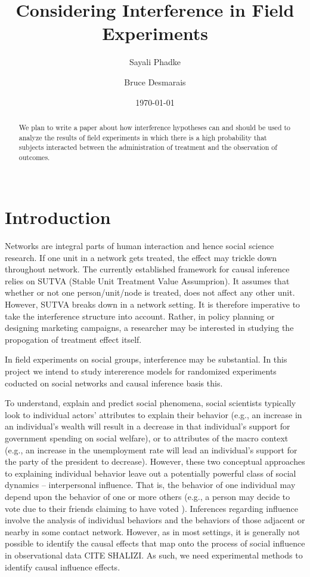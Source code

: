 \documentclass[12pt]{article}
\title{\vspace{-2cm} Considering Interference in Field Experiments }
\author{ Sayali Phadke \and Bruce Desmarais} \date{\today}
\begin{document}
\maketitle




\begin{abstract}

 \noindent  We plan to write a paper about how interference hypotheses can and should be used to analyze the results of field experiments in which there is a high probability that subjects interacted between the administration of treatment and the observation of outcomes. \\~\\

\end{abstract}
\thispagestyle{empty}
\doublespacing
\section{Introduction}

Networks are integral parts of human interaction and hence social science research. If one unit in a network gets treated, the effect may trickle down throughout network. The currently established framework for causal inference relies on SUTVA (Stable Unit Treatment Value Assumprion). It assumes that whether or not one person/unit/node is treated, does not affect any other unit. However, SUTVA breaks down in a network setting. It is therefore imperative to take the interference structure into account. Rather, in policy planning or designing marketing campaigns, a researcher may be interested in studying the propogation of treatment effect itself.

In field experiments on social groups, interference may be substantial. In this project we intend to study intererence models for randomized experiments coducted on social networks and causal inference basis this.

To understand, explain and predict social phenomena, social scientists typically look to individual actors' attributes to explain their behavior (e.g., an increase in an individual's wealth will result in a decrease in that individual's support for government spending on social welfare), or to attributes of the macro context (e.g., an increase in the unemployment rate will lead an individual's support for the party of the president to decrease). However, these two conceptual approaches to explaining individual behavior leave out a potentially powerful class of social dynamics -- interpersonal influence. That is, the behavior of one individual may depend upon the behavior of one or more others (e.g., a person may decide to vote due to their friends claiming to have voted \citep{Bond:2012}). Inferences regarding influence involve the analysis of individual behaviors and the behaviors of those adjacent or nearby in some contact network. However, as in most settings, it is generally not possible to identify the causal effects that map onto the process of social influence in observational data CITE SHALIZI. As such, we need experimental methods to identify causal influence effects.
\end{document}
